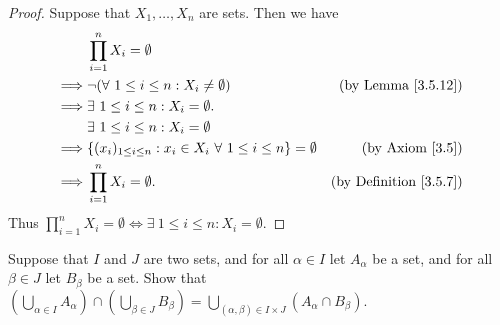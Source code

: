 \begin{proof}
    Suppose that \(X_1, \dots, X_n\) are sets.
    Then we have
    \begin{align*}
                 & \prod_{i = 1}^n X_i = \emptyset                                                                                       \\
        \implies & \lnot (\forall\ 1 \leq i \leq n : X_i \neq \emptyset)                            & \text{(by Lemma \ref{3.5.12})}     \\
        \implies & \exists\ 1 \leq i \leq n : X_i = \emptyset.                                                                           \\
                 & \exists\ 1 \leq i \leq n : X_i = \emptyset                                                                            \\
        \implies & \{(x_i)_{1 \leq i \leq n} : x_i \in X_i \ \forall\ 1 \leq i \leq n\} = \emptyset & \text{(by Axiom \ref{3.5})}        \\
        \implies & \prod_{i = 1}^n X_i = \emptyset.                                                 & \text{(by Definition \ref{3.5.7})}
    \end{align*}
    Thus \(\prod_{i = 1}^n X_i = \emptyset \iff \exists\ 1 \leq i \leq n : X_i = \emptyset\).
\end{proof}

\begin{exercise}\label{ex 3.5.9}
    Suppose that \(I\) and \(J\) are two sets, and for all \(\alpha \in I\) let \(A_{\alpha}\) be a set, and for all \(\beta \in J\) let \(B_{\beta}\) be a set.
    Show that \((\bigcup_{\alpha \in I} A_{\alpha}) \cap (\bigcup_{\beta \in J} B_{\beta}) = \bigcup_{(\alpha, \beta) \in I \times J} (A_{\alpha} \cap B_{\beta})\).
\end{exercise}

